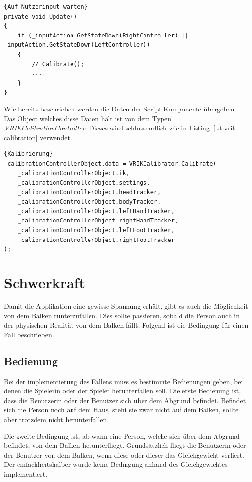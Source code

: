 \begin{lstlisting}[language={[Sharp]C},label={lst:checking-for-input}, caption={Auf Nutzerinput warten}]{Auf Nutzerinput warten}
private void Update()
{
    if (_inputAction.GetStateDown(RightController) || _inputAction.GetStateDown(LeftController))
    {
        // Calibrate();
        ...
    }
}
\end{lstlisting}

Wie bereits beschrieben werden die Daten der Script-Komponente übergeben.
Das Object welches diese Daten hält ist von dem Typen \emph{VRIKCalibrationController}.
Dieses wird schlussendlich wie in Listing~\ref{lst:vrik-calibration} verwendet.

\begin{lstlisting}[language={[Sharp]C},label={lst:vrik-calibration}, caption={Kalibrierung}]{Kalibrierung}
_calibrationControllerObject.data = VRIKCalibrator.Calibrate(
    _calibrationControllerObject.ik,
    _calibrationControllerObject.settings,
    _calibrationControllerObject.headTracker,
    _calibrationControllerObject.bodyTracker,
    _calibrationControllerObject.leftHandTracker,
    _calibrationControllerObject.rightHandTracker,
    _calibrationControllerObject.leftFootTracker,
    _calibrationControllerObject.rightFootTracker
);
\end{lstlisting}

\section{Schwerkraft}
\label{sec:gravity}

Damit die Applikation eine gewisse Spannung erhält, gibt es auch die Möglichkeit von dem Balken runterzufallen.
Dies sollte passieren, sobald die Person auch in der physischen Realität von dem Balken fällt.
Folgend ist die Bedingung für einen Fall beschrieben.

\subsection{Bedienung}\label{subsec:bedienung}

Bei der implementierung des Fallens muss es bestimmte Bedienungen geben, bei denen die Spielerin oder der Spieler herunterfallen soll.
Die erste Bedienung ist, dass die Benutzerin oder der Benutzer sich über dem Abgrund befindet.
Befindet sich die Person noch auf dem Haus, steht sie zwar nicht auf dem Balken, sollte aber trotzdem nicht herunterfallen.

Die zweite Bedingung ist, ab wann eine Person, welche sich über dem Abgrund befindet, von dem Balken herunterfliegt.
Grundsätzlich fliegt die Benutzerin oder der Benutzer von dem Balken, wenn diese oder dieser das Gleichgewicht verliert.
Der einfachheitshalber wurde keine Bedingung anhand des Gleichgewichtes implementiert.

